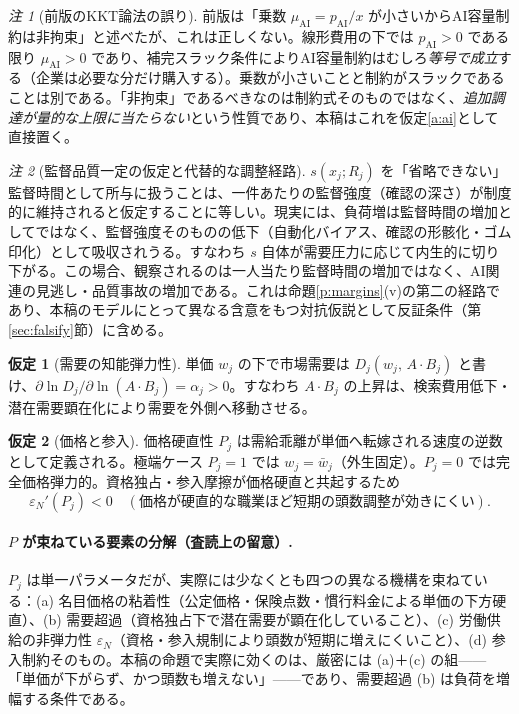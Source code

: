 \documentclass[11pt]{article}
\theoremstyle{plain}
\theoremstyle{definition}
\newtheorem{assm}{仮定}
\theoremstyle{remark}
\newtheorem*{rmk}{注}
\begin{document}
\begin{rmk}[前版のKKT論法の誤り]
前版は「乗数 $\mu_{\mathrm{AI}}=p_{\mathrm{AI}}/x$ が小さいからAI容量制約は非拘束」と述べたが、これは正しくない。線形費用の下では $p_{\mathrm{AI}}>0$ である限り $\mu_{\mathrm{AI}}>0$ であり、補完スラック条件によりAI容量制約はむしろ\emph{等号で成立}する（企業は必要な分だけ購入する）。乗数が小さいことと制約がスラックであることは別である。「非拘束」であるべきなのは制約式そのものではなく、\emph{追加調達が量的な上限に当たらない}という性質であり、本稿はこれを仮定\ref{a:ai}として直接置く。
\end{rmk}

\begin{rmk}[監督品質一定の仮定と代替的な調整経路]
$s(x_j;R_j)$ を「省略できない」監督時間として所与に扱うことは、一件あたりの監督強度（確認の深さ）が制度的に維持されると仮定することに等しい。現実には、負荷増は監督時間の増加としてではなく、監督強度そのものの低下（自動化バイアス、確認の形骸化・ゴム印化）として吸収されうる。すなわち $s$ 自体が需要圧力に応じて内生的に切り下がる。この場合、観察されるのは一人当たり監督時間の増加ではなく、AI関連の見逃し・品質事故の増加である。これは命題\ref{p:margins}(v)の第二の経路であり、本稿のモデルにとって異なる含意をもつ対抗仮説として反証条件（第\ref{sec:falsify}節）に含める。
\end{rmk}

\begin{assm}[需要の知能弾力性]\label{a:dem}
単価 $w_j$ の下で市場需要は $D_j(w_j,\,A\cdot B_j)$ と書け、$\partial\ln D_j/\partial\ln(A\cdot B_j)=\alpha_j>0$。すなわち $A\cdot B_j$ の上昇は、検索費用低下・潜在需要顕在化により需要を外側へ移動させる。
\end{assm}

\begin{assm}[価格と参入]\label{a:price}
価格硬直性 $P_j$ は需給乖離が単価へ転嫁される速度の逆数として定義される。極端ケース $P_j=1$ では $w_j=\bar w_j$（外生固定）。$P_j=0$ では完全価格弾力的。資格独占・参入摩擦が価格硬直と共起するため
\[
\varepsilon_N'(P_j)<0\quad(\text{価格が硬直的な職業ほど短期の頭数調整が効きにくい}).
\]
\end{assm}

\paragraph{$P$ が束ねている要素の分解（査読上の留意）.}
$P_j$ は単一パラメータだが、実際には少なくとも四つの異なる機構を束ねている：(a) 名目価格の粘着性（公定価格・保険点数・慣行料金による単価の下方硬直）、(b) 需要超過（資格独占下で潜在需要が顕在化していること）、(c) 労働供給の非弾力性 $\varepsilon_N$（資格・参入規制により頭数が短期に増えにくいこと）、(d) 参入制約そのもの。本稿の命題で実際に効くのは、厳密には (a)＋(c) の組——「単価が下がらず、かつ頭数も増えない」——であり、需要超過 (b) は負荷を増幅する条件である。
\end{document}

